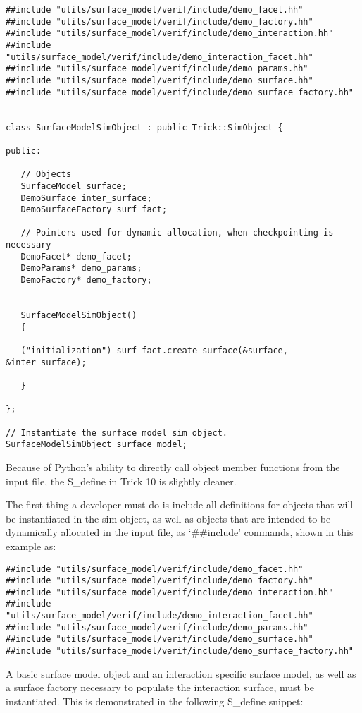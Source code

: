 \begin{verbatim}
##include "utils/surface_model/verif/include/demo_facet.hh"
##include "utils/surface_model/verif/include/demo_factory.hh"
##include "utils/surface_model/verif/include/demo_interaction.hh"
##include "utils/surface_model/verif/include/demo_interaction_facet.hh"
##include "utils/surface_model/verif/include/demo_params.hh"
##include "utils/surface_model/verif/include/demo_surface.hh"
##include "utils/surface_model/verif/include/demo_surface_factory.hh"


class SurfaceModelSimObject : public Trick::SimObject {

public:

   // Objects
   SurfaceModel surface;
   DemoSurface inter_surface;
   DemoSurfaceFactory surf_fact;

   // Pointers used for dynamic allocation, when checkpointing is necessary
   DemoFacet* demo_facet;
   DemoParams* demo_params;
   DemoFactory* demo_factory;


   SurfaceModelSimObject()
   {

   ("initialization") surf_fact.create_surface(&surface, &inter_surface);

   }

};

// Instantiate the surface model sim object.
SurfaceModelSimObject surface_model;
\end{verbatim}

Because of Python's ability to directly call object member functions from the input file, the S\_define
in Trick 10 is slightly cleaner.

The first thing a developer must do is include all definitions for objects that will be instantiated
in the sim object, as well as objects that are intended to be dynamically allocated in the input file,
as `\#\#include' commands, shown in this example as:

\begin{verbatim}
##include "utils/surface_model/verif/include/demo_facet.hh"
##include "utils/surface_model/verif/include/demo_factory.hh"
##include "utils/surface_model/verif/include/demo_interaction.hh"
##include "utils/surface_model/verif/include/demo_interaction_facet.hh"
##include "utils/surface_model/verif/include/demo_params.hh"
##include "utils/surface_model/verif/include/demo_surface.hh"
##include "utils/surface_model/verif/include/demo_surface_factory.hh"
\end{verbatim}

A basic surface model object and an interaction specific surface model, as well
as a surface factory necessary to populate the interaction surface, must be instantiated.
This is demonstrated in the following S\_define snippet:

